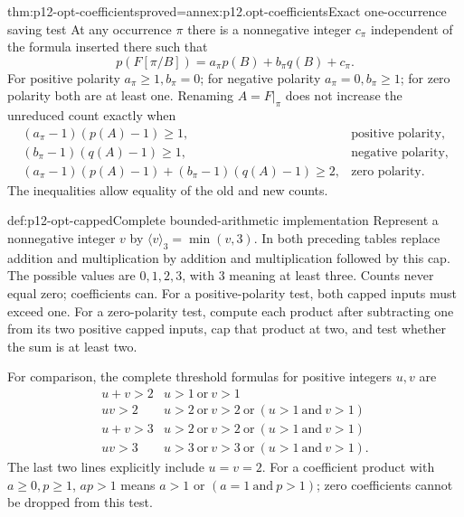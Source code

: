 \begin{hbtheorem}{thm:p12-opt-coefficients}{proved=annex:p12.opt-coefficients}{Exact one-occurrence saving test}
At any occurrence \(\pi\) there is a nonnegative integer \(c_\pi\)
independent of the formula inserted there such that
\[
 p(F[\pi/B])=a_\pi p(B)+b_\pi q(B)+c_\pi.
\]
For positive polarity \(a_\pi\ge1,b_\pi=0\); for negative polarity
\(a_\pi=0,b_\pi\ge1\); for zero polarity both are at least one.
Renaming \(A=F|_\pi\) does not increase the unreduced count exactly when
\[
\begin{array}{ll}
(a_\pi-1)(p(A)-1)\ge1,&\text{positive polarity},\\
(b_\pi-1)(q(A)-1)\ge1,&\text{negative polarity},\\
(a_\pi-1)(p(A)-1)+(b_\pi-1)(q(A)-1)\ge2,
 &\text{zero polarity}.
\end{array}
\]
The inequalities allow equality of the old and new counts.
\end{hbtheorem}

\begin{hbmethod}{def:p12-opt-capped}{Complete bounded-arithmetic implementation}
Represent a nonnegative integer \(v\) by
\(\langle v\rangle_3=\min(v,3)\). In both preceding tables replace
addition and multiplication by addition and multiplication followed
by this cap. The possible values are \(0,1,2,3\), with \(3\)
meaning at least three. Counts never equal zero; coefficients can.
For a positive-polarity test, both capped inputs must exceed one.
For a zero-polarity test, compute each product after subtracting one
from its two positive capped inputs, cap that product at two, and
test whether the sum is at least two.

For comparison, the complete threshold formulas for positive integers
\(u,v\) are
\[
\begin{array}{c|l}
u+v>2&u>1\ \text{or}\ v>1\\
uv>2&u>2\ \text{or}\ v>2\ \text{or}\ (u>1\ \text{and}\ v>1)\\
u+v>3&u>2\ \text{or}\ v>2\ \text{or}\ (u>1\ \text{and}\ v>1)\\
uv>3&u>3\ \text{or}\ v>3\ \text{or}\ (u>1\ \text{and}\ v>1).
\end{array}
\]
The last two lines explicitly include \(u=v=2\).
For a coefficient product with \(a\ge0,p\ge1\),
\(ap>1\) means \(a>1\) or \((a=1\ \text{and}\ p>1)\);
zero coefficients cannot be dropped from this test.
\end{hbmethod}

